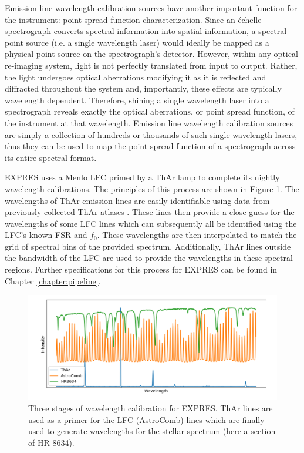 Emission line wavelength calibration sources have another important function for the instrument: point spread function characterization. Since an \'echelle spectrograph converts spectral information into spatial information, a spectral point source (i.e. a single wavelength laser) would ideally be mapped as a physical point source on the spectrograph's detector. However, within any optical re-imaging system, light is not perfectly translated from input to output. Rather, the light undergoes optical aberrations modifying it as it is reflected and diffracted throughout the system and, importantly, these effects are typically wavelength dependent. Therefore, shining a single wavelength laser into a spectrograph reveals exactly the optical aberrations, or point spread function, of the instrument at that wavelength. Emission line wavelength calibration sources are simply a collection of hundreds or thousands of such single wavelength lasers, thus they can be used to map the point spread function of a spectrograph across its entire spectral format.

EXPRES uses a Menlo LFC primed by a ThAr lamp to complete its nightly wavelength calibrations. The principles of this process are shown in Figure \ref{fig:calibration}. The wavelengths of ThAr emission lines are easily identifiable using data from previously collected ThAr atlases \citep{palmer_atlas_1983, redman_spectrum_2014}. These lines then provide a close guess for the wavelengths of some LFC lines which can subsequently all be identified using the LFC's known FSR and $f_0$. These wavelengths are then interpolated to match the grid of spectral bins of the provided spectrum. Additionally, ThAr lines outside the bandwidth of the LFC are used to provide the wavelengths in these spectral regions. Further specifications for this process for EXPRES can be found in Chapter \ref{chapter:pipeline}.

\begin{figure}
    \centering
    \includegraphics[width=\textwidth]{figures-1/calibration.png}
    \caption[EXPRES Wavelength Calibration]{Three stages of wavelength calibration for EXPRES. ThAr lines are used as a primer for the LFC (AstroComb) lines which are finally used to generate wavelengths for the stellar spectrum (here a section of HR 8634).}
    \label{fig:calibration}
\end{figure}

